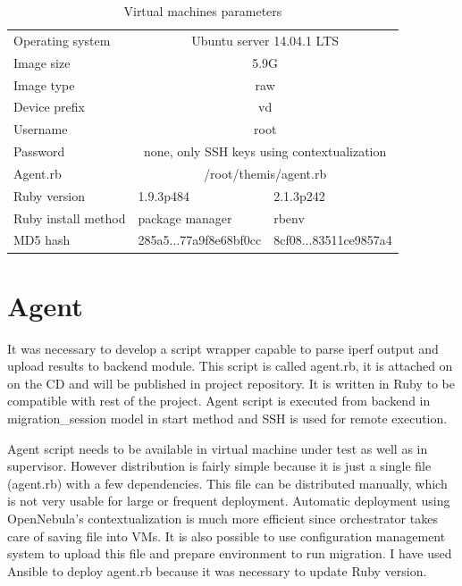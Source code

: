 \begin{table}[htb]
\begin{center}
	\caption{Virtual machines parameters}
	\label{tab:vm-params}
	\begin{tabular}{|l|l|l|}
	\hline
	\Th{Parameter} & \Th{VM for migration} & \Th{Supervisor} \\
	\hline
	Operating system & \multicolumn{2}{c|}{Ubuntu server 14.04.1 LTS} \\
	\hline
	Image size & \multicolumn{2}{c|}{5.9G} \\
	\hline
	Image type & \multicolumn{2}{c|}{raw} \\
	\hline
	Device prefix & \multicolumn{2}{c|}{vd} \\
	\hline
	Username & \multicolumn{2}{c|}{root} \\
	\hline
	Password & \multicolumn{2}{c|}{none, only \Ac{SSH} keys using contextualization}\\
	\hline
	Agent.rb & \multicolumn{2}{c|}{/root/themis/agent.rb}\\
	\hline
	Ruby version & 1.9.3p484 & 2.1.3p242 \\
	\hline
	Ruby install method & package manager & rbenv \\
	\hline
	MD5 hash & 285a5...77a9f8e68bf0cc & 8cf08...83511ce9857a4 \\
	\hline
	\end{tabular}
\end{center}
\end{table}


\section{Agent}
It was necessary to develop a script wrapper capable to parse iperf output and upload results to backend module. This script is called agent.rb, it is attached on on the CD and will be published in project repository. It is written in Ruby to be compatible with rest of the project. Agent script is executed from backend in migration\_session model in start method and \Ac{SSH} is used for remote execution.

Agent script needs to be available in virtual machine under test as well as in supervisor. However distribution is fairly simple because it is just a single file (agent.rb) with a few dependencies. This file can be distributed manually, which is not very usable for large or frequent deployment. Automatic deployment using OpenNebula's contextualization is much more efficient since orchestrator takes care of saving file into \Ac{VM}s. 
It is also possible to use configuration management system to upload this file and prepare environment to run migration. I have used Ansible to deploy agent.rb because it was necessary to update Ruby version. 


